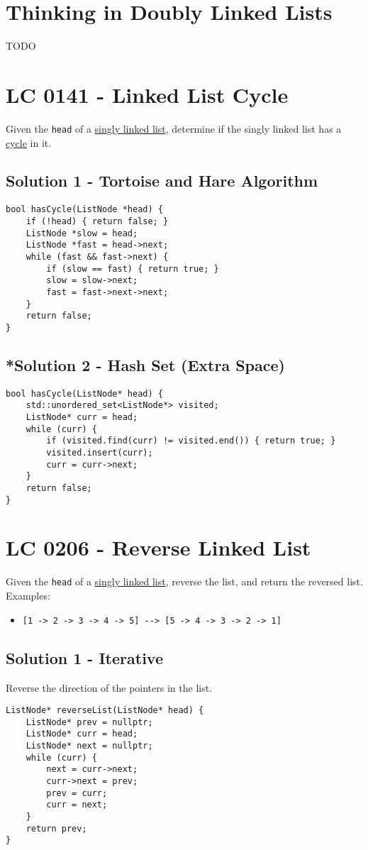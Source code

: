 \section{Thinking in Doubly Linked Lists}
TODO

\section{LC 0141 - Linked List Cycle}\label{lc0141}
Given the {\colorbox{CodeBackground}{\lstinline|head|}} of a \ul{singly linked list}, determine if the singly linked list has a \ul{cycle} in it.

\subsection*{Solution 1 - Tortoise and Hare Algorithm}
\begin{lstlisting}
bool hasCycle(ListNode *head) {
	if (!head) { return false; }
	ListNode *slow = head;
	ListNode *fast = head->next;
	while (fast && fast->next) {
		if (slow == fast) { return true; }
		slow = slow->next;
		fast = fast->next->next;
	}
	return false;
}
\end{lstlisting}

\subsection*{*Solution 2 - Hash Set (Extra Space)}
\begin{lstlisting}
bool hasCycle(ListNode* head) {
	std::unordered_set<ListNode*> visited;
	ListNode* curr = head;
	while (curr) {
		if (visited.find(curr) != visited.end()) { return true; }
		visited.insert(curr);
		curr = curr->next;
	}
	return false;
}
\end{lstlisting}

\section{LC 0206 - Reverse Linked List}
Given the {\colorbox{CodeBackground}{\lstinline|head|}} of a \ul{singly linked list}, reverse the list, and return the reversed list.\\

Examples:
\begin{itemize}
	\item {\colorbox{CodeBackground}{\lstinline|[1 -> 2 -> 3 -> 4 -> 5] --> [5 -> 4 -> 3 -> 2 -> 1]|}}
\end{itemize}

\subsection*{Solution 1 - Iterative}\label{solution:lc0206_iterative1}
Reverse the direction of the pointers in the list.
\begin{lstlisting}
ListNode* reverseList(ListNode* head) {
	ListNode* prev = nullptr;
	ListNode* curr = head;
	ListNode* next = nullptr;
	while (curr) {
		next = curr->next;
		curr->next = prev;
		prev = curr;
		curr = next;
	}
	return prev;
}
\end{lstlisting}

